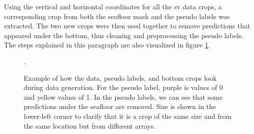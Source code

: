         Using the vertical and horizontal coordinates for all the \gls{sv} data crops, a corresponding crop from both the seafloor mask and the pseudo labels was extracted. The two new crops were then used together to remove predictions that appeared under the bottom, thus cleaning and preprocessing the pseudo labels. The steps explained in this paragraph are also visualized in figure \ref{crop_extract_fig}.

        
        \begin{figure}[H]
            \centering
            
            \caption[Data, label and bottom crop extraction and interaction]{Example of how the data, pseudo labels, and bottom crops look during data generation. For the pseudo label, purple is values of 0 and yellow values of 1. In the pseudo labels, we can see that some predictions under the seafloor are removed.  Size is shown in the lower-left corner to clarify that it is a crop of the same size and from the same location but from different arrays.}.
          	\medskip 
            \label{crop_extract_fig}
        \end{figure}
        
